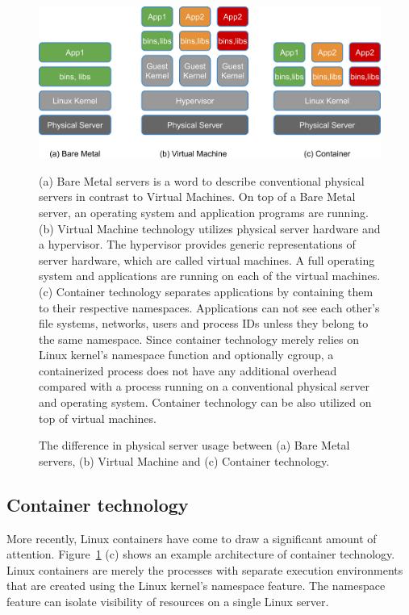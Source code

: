 \begin{figure}[h]
\begin{center}
\includegraphics[width=0.8\columnwidth]{Figs/physical_vm_container.png}
\end{center}
\captionsetup{margin=1cm}
\caption{
The difference in physical server usage between (a) Bare Metal servers, (b) Virtual Machine and (c) Container technology.
}

\centering\parbox[c]{0.9\columnwidth}{
(a) Bare Metal servers is a word to describe conventional physical servers in contrast to Virtual Machines.
On top of a Bare Metal server, an operating system and application programs are running.
(b) Virtual Machine technology utilizes physical server hardware and a hypervisor.
The hypervisor provides generic representations of server hardware, which are called virtual machines.
A full operating system and applications are running on each of the virtual machines.
(c) Container technology separates applications by containing them to their respective namespaces.
Applications can not see each other's file systems, networks, users and process IDs unless they belong to the same namespace.
Since container technology merely relies on Linux kernel's namespace function and optionally cgroup, a containerized process does not have any additional overhead compared with a process running on a conventional physical server and operating system.
Container technology can be also utilized on top of virtual machines.
}
\label{fig:physical_vm_container}
\end{figure}

\subsection{Container technology}

More recently, Linux containers \cite{menage2007adding} have come to draw a significant amount of attention.
Figure~\ref{fig:physical_vm_container} (c) shows an example architecture of container technology. 
Linux containers are merely the processes with separate execution environments that are created using the Linux kernel's namespace feature.
The namespace feature can isolate visibility of resources on a single Linux server.

